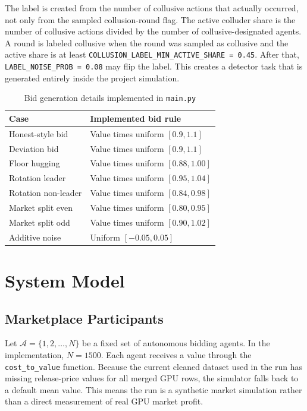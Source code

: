 \documentclass[conference]{IEEEtran}
\begin{document}
The label is created from the number of collusive actions that actually occurred, not only from the sampled collusion-round flag. The active colluder share is the number of collusive actions divided by the number of collusive-designated agents. A round is labeled collusive when the round was sampled as collusive and the active share is at least \texttt{COLLUSION\_LABEL\_MIN\_ACTIVE\_SHARE = 0.45}. After that, \texttt{LABEL\_NOISE\_PROB = 0.08} may flip the label. This creates a detector task that is generated entirely inside the project simulation.

\begin{table}[htbp]
\caption{Bid generation details implemented in \texttt{main.py}}
\label{tab:bidgen}
\centering
\begin{tabular}{ll}
\toprule
\textbf{Case} & \textbf{Implemented bid rule} \\
\midrule
Honest-style bid & Value times uniform $[0.9,1.1]$ \\
Deviation bid & Value times uniform $[0.9,1.1]$ \\
Floor hugging & Value times uniform $[0.88,1.00]$ \\
Rotation leader & Value times uniform $[0.95,1.04]$ \\
Rotation non-leader & Value times uniform $[0.84,0.98]$ \\
Market split even & Value times uniform $[0.80,0.95]$ \\
Market split odd & Value times uniform $[0.90,1.02]$ \\
Additive noise & Uniform $[-0.05,0.05]$ \\
\bottomrule
\end{tabular}
\end{table}

\section{System Model}
\subsection{Marketplace Participants}
Let $\mathcal{A} = \{1,2,\ldots,N\}$ be a fixed set of autonomous bidding agents. In the implementation, $N=1500$. Each agent receives a value through the \texttt{cost\_to\_value} function. Because the current cleaned dataset used in the run has missing release-price values for all merged GPU rows, the simulator falls back to a default mean value. This means the run is a synthetic market simulation rather than a direct measurement of real GPU market profit.
\end{document}
